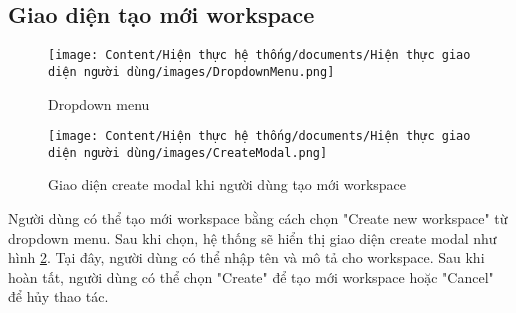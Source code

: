 \subsection{Giao diện tạo mới workspace}

\begin{figure}[H]
    \centering
    \texttt{[image: Content/Hiện thực hệ thống/documents/Hiện thực giao diện người dùng/images/DropdownMenu.png]}
    \vspace{0.5cm}
    \caption{Dropdown menu}
    \label{fig: Giao diện dropdown menu của mỗi item workspace}
\end{figure}

\begin{figure}[H]
    \centering
    \texttt{[image: Content/Hiện thực hệ thống/documents/Hiện thực giao diện người dùng/images/CreateModal.png]}
    \vspace{0.5cm}
    \caption{Giao diện create modal khi người dùng tạo mới workspace}
    \label{fig: Giao diện create modal khi người dùng tạo mới workspace}
\end{figure}

Người dùng có thể tạo mới workspace bằng cách chọn "Create new workspace" từ dropdown menu. Sau khi chọn, hệ thống sẽ hiển thị giao diện create modal như hình \ref{fig: Giao diện create modal khi người dùng tạo mới workspace}. Tại đây, người dùng có thể nhập tên và mô tả cho workspace. Sau khi hoàn tất, người dùng có thể chọn "Create" để tạo mới workspace hoặc "Cancel" để hủy thao tác.